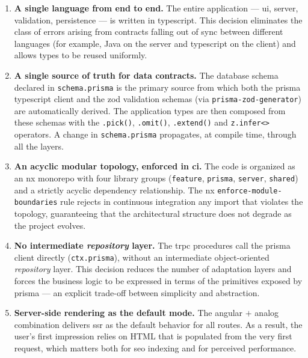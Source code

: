 \begin{enumerate}
  \item \textbf{A single language from end to end.} The entire application --- \acrshort{ui}, server, validation, persistence --- is written in \gls{typescript}. This decision eliminates the class of errors arising from contracts falling out of sync between different languages (for example, Java on the server and \gls{typescript} on the client) and allows types to be reused uniformly.

  \item \textbf{A single source of truth for data contracts.} The database schema declared in \texttt{schema.prisma} is the primary source from which both the \gls{prisma} \gls{typescript} client and the \gls{zod} validation schemas (via \texttt{prisma-zod-generator}) are automatically derived. The application types are then composed from these schemas with the \texttt{.pick()}, \texttt{.omit()}, \texttt{.extend()} and \texttt{z.infer<>} operators. A change in \texttt{schema.prisma} propagates, at compile time, through all the layers.

  \item \textbf{An acyclic modular topology, enforced in \acrshort{ci}.} The code is organized as an \gls{nx} \gls{monorepo} with four library groups (\texttt{feature}, \texttt{prisma}, \texttt{server}, \texttt{shared}) and a strictly acyclic dependency relationship. The \gls{nx} \texttt{enforce-module-boundaries} rule rejects in continuous integration any import that violates the topology, guaranteeing that the architectural structure does not degrade as the project evolves.

  \item \textbf{No intermediate \textit{repository} layer.} The \gls{trpc} procedures call the \gls{prisma} client directly (\texttt{ctx.prisma}), without an intermediate object-oriented \textit{repository} layer. This decision reduces the number of adaptation layers and forces the business logic to be expressed in terms of the primitives exposed by \gls{prisma} --- an explicit trade-off between simplicity and abstraction.

  \item \textbf{Server-side rendering as the default mode.} The \gls{angular} \(+\) \gls{analog} combination delivers \acrshort{ssr} as the default behavior for all routes. As a result, the user's first impression relies on HTML that is populated from the very first request, which matters both for \acrshort{seo} indexing and for perceived performance.
\end{enumerate}

